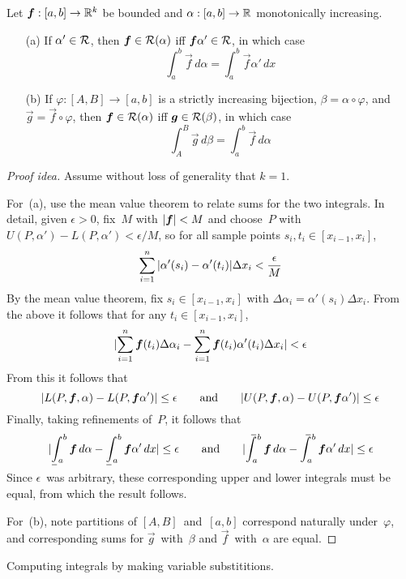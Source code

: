 \begin{thm}
Let \(\boldsymbol{f}:[a,b]\to\mathbb{R}^k\) be bounded and \(\alpha:[a,b]\to\mathbb{R}\) monotonically increasing.
\begin{enumerate}[itemsep=0pt]
\item[(a)] If \(\alpha'\in\mathcal{R}\), then \(\boldsymbol{f}\in\mathcal{R}(\alpha)\) iff \(\boldsymbol{f}\alpha'\in\mathcal{R}\), in which case
\[\int_a^b\vec{f}\,d\alpha=\int_a^b\vec{f}\alpha'\,dx\]
\item[(b)] If \(\varphi:[A,B]\to[a,b]\) is a strictly increasing bijection, \(\beta=\alpha\circ\varphi\), and \(\vec{g}=\vec{f}\circ\varphi\), then \(\boldsymbol{f}\in\mathcal{R}(\alpha)\) iff \(\boldsymbol{g}\in\mathcal{R}(\beta)\), in which case
\[\int_A^B\vec{g}\,d\beta=\int_a^b\vec{f}\,d\alpha\]
\end{enumerate}
\end{thm}
\begin{proof}[Proof idea]
Assume without loss of generality that \(k=1\).

For~(a), use the mean value theorem to relate sums for the two integrals. In detail, given \(\epsilon>0\), fix~\(M\) with \(|{\boldsymbol{f}}|<M\) and choose~\(P\) with \(U(P,\alpha')-L(P,\alpha')<\epsilon/M\), so for all sample points \(s_i,t_i\in[x_{i-1},x_i]\),
\[\sum_{i=1}^n|{\alpha'(s_i)-\alpha'(t_i)}|\Delta x_i<\frac{\epsilon}{M}\]
By the mean value theorem, fix \(s_i\in[x_{i-1},x_i]\) with \(\Delta\alpha_i=\alpha'(s_i)\Delta x_i\). From the above it follows that for any \(t_i\in[x_{i-1},x_i]\),
\[|{\sum_{i=1}^n\boldsymbol{f}(t_i)\Delta\alpha_i-\sum_{i=1}^n\boldsymbol{f}(t_i)\alpha'(t_i)\Delta x_i}|<\epsilon\]
From this it follows that
\[|{L(P,\boldsymbol{f},\alpha)-L(P,\boldsymbol{f}\alpha')}|\le\epsilon\qquad\text{and}\qquad|{U(P,\boldsymbol{f},\alpha)-U(P,\boldsymbol{f}\alpha')}|\le\epsilon\]
Finally, taking refinements of~\(P\), it follows that
\[\abs{\lowerint{a}{b}\vec{f}\,d\alpha-\lowerint{a}{b}\vec{f}\alpha'\,dx}\le\epsilon
\qquad\text{and}\qquad
\abs{\upperint{a}{b}\vec{f}\,d\alpha-\upperint{a}{b}\vec{f}\alpha'\,dx}\le\epsilon\]
Since \(\epsilon\)~was arbitrary, these corresponding upper and lower integrals must be equal, from which the result follows.

For~(b), note partitions of \([A,B]\)~and~\([a,b]\) correspond naturally under~\(\varphi\), and corresponding sums for \(\vec{g}\)~with~\(\beta\) and \(\vec{f}\)~with~\(\alpha\) are equal.
\end{proof}
\begin{app}
Computing integrals by making variable substititions.
\end{app}

